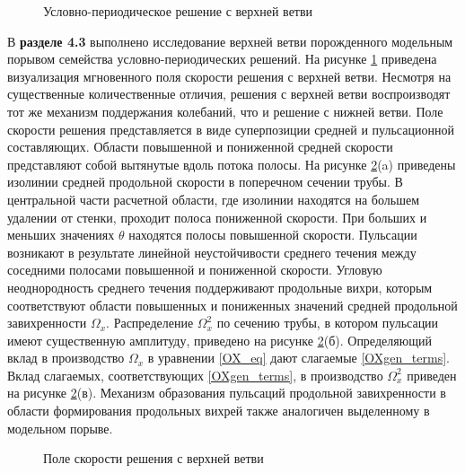 \begin{figure}
\caption{Условно-периодическое решение с верхней ветви}
\label{3D_ub_pic}
\end{figure} 

В \textbf{разделе 4.3} выполнено исследование верхней ветви порожденного модельным порывом семейства условно-периодических решений. На рисунке \ref{3D_ub_pic} приведена визуализация мгновенного поля скорости решения с верхней ветви. Несмотря на существенные количественные отличия, решения с верхней ветви воспроизводят тот же механизм поддержания колебаний, что и решение с нижней ветви. Поле скорости решения представляется в виде суперпозиции средней и пульсационной составляющих. Области повышенной и пониженной средней скорости представляют собой вытянутые вдоль потока полосы. На рисунке \ref{ub_cs_pic}(a) приведены изолинии средней продольной скорости в поперечном сечении трубы. В центральной части расчетной области, где изолинии находятся на большем удалении от стенки, проходит полоса пониженной скорости. При больших и меньших значениях $\theta$ находятся полосы повышенной скорости. Пульсации возникают в результате линейной неустойчивости среднего течения между соседними полосами повышенной и пониженной скорости. Угловую неоднородность среднего течения поддерживают продольные вихри, которым соответствуют области повышенных и пониженных значений средней продольной завихренности $\Omega_x$. Распределение $\Omega^2_x$ по сечению трубы, в котором пульсации имеют существенную амплитуду, приведено на рисунке \ref{ub_cs_pic}(б). Определяющий вклад в производство $\Omega_x$ в уравнении \eqref{OX_eq} дают слагаемые \eqref{OXgen_terms}. Вклад слагаемых, соответствующих \eqref{OXgen_terms}, в производство $\Omega^2_x$ приведен на рисунке \ref{ub_cs_pic}(в). Механизм образования пульсаций продольной завихренности в области формирования продольных вихрей также аналогичен выделенному в модельном порыве. 


\begin{figure}
\caption{Поле скорости решения с верхней ветви}
\label{ub_cs_pic}
\end{figure} 


